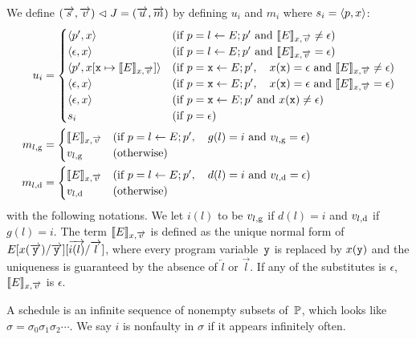 {We define $
(\overrightarrow s, \overrightarrow v) \vartriangleleft J = (\overrightarrow u, \overrightarrow m)
$ by defining
$u_i$ and $m_i$
where $s_i = \langle{p,x}\rangle$:
\begin{align*}
 u_i & =
 \begin{cases}
 \langle{p',x}\rangle  & (\text{if } p = l
 \leftarrow E; p' \text{ and }\llbracket{E}\rrbracket_{x,\overrightarrow v} \neq \epsilon)
 \\
 \langle{\epsilon,x}\rangle  & (\text{if } p = l
 \leftarrow E; p' \text{ and }\llbracket{E}\rrbracket_{x,\overrightarrow v} = \epsilon)
 \\
 \langle{p', x[\texttt{x} \mapsto \llbracket{E}\rrbracket_{x, \overrightarrow v}]}\rangle&
                       (\text{if } p = \texttt{x} \leftarrow E; p', \quad
 x(\texttt{x}) = \epsilon  \text{ and } \llbracket{E}\rrbracket_{x, \overrightarrow v} \neq \epsilon) \\
 \langle{\epsilon, x}\rangle&
                      (\text{if } p = \texttt{x} \leftarrow E; p',  \quad
 x(\texttt{x}) = \epsilon  \text{ and } \llbracket{E}\rrbracket_{x, \overrightarrow v} = \epsilon) \\
 \langle{\epsilon, x}\rangle & (\text{if } p = \texttt{x} \leftarrow E; p' \text{
 and }
 x(\texttt{x}) \neq \epsilon) \\
 s_i & (\text{if } p = \epsilon)
 \end{cases}\\
 {m}_{l, \mathrm g} & =
 \begin{cases}
 \llbracket{E}\rrbracket_{x, \overrightarrow v} & (\text{if } p = l \leftarrow E; p',\quad g(l)= i \text{
 and } {v}_{l, \mathrm g} = \epsilon) \\
 {v}_{l, \mathrm g} &(\text{otherwise})
 \end{cases}\\
 {m}_{l, \mathrm d} &=
 \begin{cases}
\llbracket{E}\rrbracket_{x, \overrightarrow v} &
  (\text{if } p = l \leftarrow E; p',\quad d(l)= i \text{
 and } {v}_{l, \mathrm d} = \epsilon) \\
 {v}_{l, \mathrm d} &(\text{otherwise})
 \end{cases}
\end{align*}
with the following notations.
We let $i(l)$ to be ${v}_{l, \mathrm g}$ if $d(l)=i$ and
${v}_{l, \mathrm d}$ if $g(l) = i$.
The term
$\llbracket{E}\rrbracket_{x, \overrightarrow v}$ is defined as the unique normal form
of $E[x(\overrightarrow{\texttt{y}}) / \overrightarrow{\texttt{y}}][\overrightarrow{i(l)}/\overrightarrow l]$, where
every program variable~$\texttt{y}$ is replaced by $x(\texttt{y})$ and the
uniqueness is guaranteed by the absence of $\overleftarrow l$ or
$\overrightarrow l$.
If any of the substitutes is $\epsilon$,
$\llbracket{E}\rrbracket_{x, \overrightarrow v}$ is $\epsilon$.

A schedule is an infinite sequence of nonempty subsets of~$\mathbb{P}$,
which looks like $\sigma = \sigma_0\sigma_1\sigma_2\cdots$.
We say $i$ is nonfaulty in $\sigma$
if it appears infinitely often.

}
